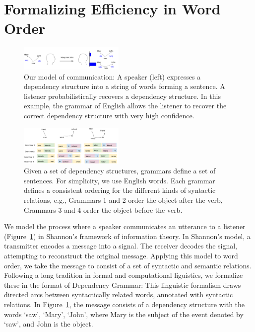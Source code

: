 \documentclass[9pt,twocolumn,twoside,lineno]{pnas-new}
\begin{document}
\section{Formalizing Efficiency in Word Order}


\begin{figure}
    \centering
    \includegraphics[width=0.45\textwidth]{figures/communication.png}
	\caption{Our model of communication: A speaker (left) expresses a dependency structure into a string of words forming a sentence. A listener probabilistically recovers a dependency structure. In this example, the grammar of English allows the listener to recover the correct dependency structure with very high confidence.}
	\label{fig:comm}
\end{figure}




\begin{figure}
    \centering
    \includegraphics[width=0.45\textwidth]{figures/grammars.png}
	\caption{Given a set of dependency structures, grammars define a set of sentences. For simplicity, we use English words. Each grammar defines a consistent ordering for the different kinds of syntactic relations, e.g., Grammars 1 and 2 order the object after the verb, Grammars 3 and 4 order the object before the verb. }
	\label{fig:grammars}
\end{figure}



We model the process where a speaker communicates an utterance to a listener (Figure~\ref{fig:comm}) in Shannon's framework of information theory.
In Shannon's model, a transmitter encodes a message into a signal. The receiver decodes the signal, attempting to reconstruct the original message.
Applying this model to word order, we take the message to consist of a set of syntactic and semantic relations.
Following a long tradition in formal and computational liguistics, we formalize these in the format of Dependency Grammar:
This linguistic formalism draws directed arcs between syntactically related words, annotated with syntactic relations.
In Figure~\ref{fig:comm}, the message consists of a dependency structure with the words `saw', `Mary', `John', where Mary is the subject of the event denoted by `saw', and John is the object.
\end{document}
